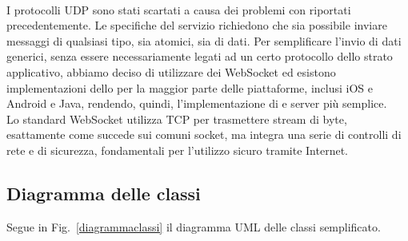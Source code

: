 	\paragraph*{}
	I protocolli UDP sono stati scartati a causa dei problemi con  riportati precedentemente.
	Le specifiche del servizio richiedono che sia possibile inviare messaggi di qualsiasi tipo, sia atomici, sia  di dati. Per semplificare l'invio di dati generici, senza essere necessariamente legati ad un certo protocollo dello strato applicativo, abbiamo deciso di utilizzare dei WebSocket ed esistono implementazioni  dello  per la maggior parte delle piattaforme, inclusi iOS e Android e Java, rendendo, quindi, l'implementazione di  e server più semplice.
	\\
	Lo standard WebSocket utilizza TCP per trasmettere stream di byte, esattamente come succede sui comuni socket, ma integra una serie di controlli di rete e di sicurezza, fondamentali per l'utilizzo sicuro tramite Internet.
	
	\subsection{Diagramma delle classi}
	Segue in Fig.~\ref{diagrammaclassi} il diagramma \gls{UML} delle classi semplificato.

